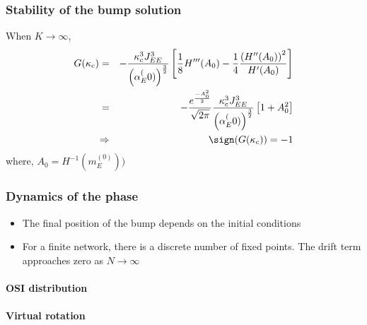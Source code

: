 \subsubsection*{Stability of the bump solution}
When $K \rightarrow \infty$, 
\begin{eqnarray}
G(\kappa_c)  =&& -\frac{\kappa^3_c J_{EE}^{3}}{\left( \alpha_E^(0) \right)^{\frac{3}{2}}} \left[ \frac{1}{8} H^{\prime \prime \prime} (A_0) - \frac{1}{4} \frac{\left( H^{\prime \prime} (A_0)\right)^2 }{H^{\prime}(A_0)} \right] \\
=&& - \frac{e^{\frac{-A^2_0}{2}}}{\sqrt{2 \pi}} \frac{\kappa^3_c J_{EE}^{3}}{\left( \alpha_E^(0) \right)^{\frac{3}{2}}}  \left[1 + A^2_0 \right] \\
\Rightarrow&& \sign(G(\kappa_c)) = -1
\end{eqnarray}
where, $A_{0} = H^{-1}(m_E^{(0)}))$

\subsubsection{Dynamics of the phase}

\begin{itemize}
  \item The final position of the bump depends on the initial conditions
  \item For a finite network, there is a discrete number of fixed points. The drift term approaches zero as $N \rightarrow \infty$
\end{itemize}




\paragraph{OSI distribution}


\paragraph{Virtual rotation}







